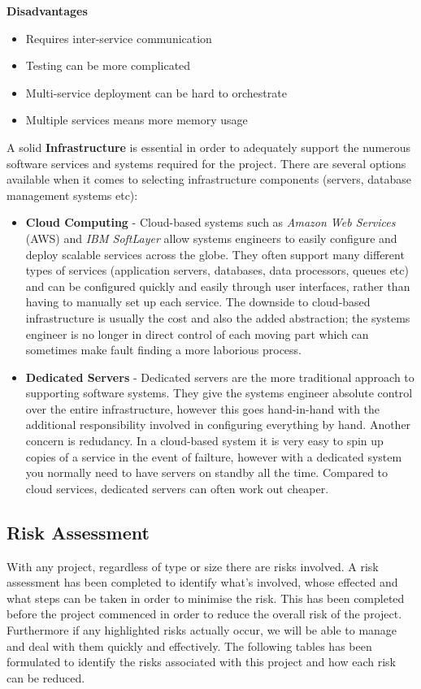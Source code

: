     \textbf{Disadvantages}
    \begin{itemize}
      \item Requires inter-service communication
      \item Testing can be more complicated
      \item Multi-service deployment can be hard to orchestrate
      \item Multiple services means more memory usage
    \end{itemize}
A solid \textbf{Infrastructure} is essential in order to adequately support the numerous software services and systems required for the project. There are several options available when it comes to selecting infrastructure components (servers, database management systems etc):
    \begin{itemize}
      \item \textbf{Cloud Computing} - 
        Cloud-based systems such as \emph{Amazon Web Services} (AWS) and \emph{IBM SoftLayer} allow systems engineers to easily configure and deploy scalable services across the globe. They often support many different types of services (application servers, databases, data processors, queues etc) and can be configured quickly and easily through user interfaces, rather than having to manually set up each service. The downside to cloud-based infrastructure is usually the cost and also the added abstraction; the systems engineer is no longer in direct control of each moving part which can sometimes make fault finding a more laborious process.
      \item \textbf{Dedicated Servers} - 
        Dedicated servers are the more traditional approach to supporting software systems. They give the systems engineer absolute control over the entire infrastructure, however this goes hand-in-hand with the additional responsibility involved in configuring everything by hand. Another concern is redudancy. In a cloud-based system it is very easy to spin up copies of a service in the event of failture, however with a dedicated system you normally need to have servers on standby all the time. Compared to cloud services, dedicated servers can often work out cheaper.
    \end{itemize}

\subsection{Risk Assessment}
With any project, regardless of type or size there are risks involved. A risk assessment has been completed to identify what's involved, whose effected and what steps can be taken in order to minimise the risk.  This has been completed before the project commenced in order to reduce the overall risk of the project.  Furthermore if any highlighted risks actually occur, we will be able to manage and deal with them quickly and effectively.  The following tables has been formulated to identify the risks associated with this project and how each risk can be reduced.\\

